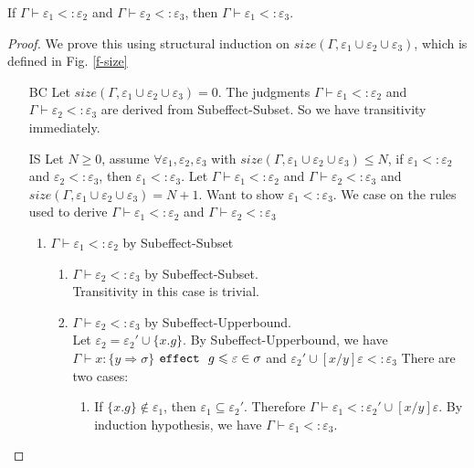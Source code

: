 \begin{lemma}
If $\Gamma \vdash \varepsilon_1 <: \varepsilon_2$ and $\Gamma \vdash \varepsilon_2 <: \varepsilon_3$, then $\Gamma \vdash \varepsilon_1 <: \varepsilon_3$.
\label{lemma-trans-effect}
\end{lemma}
\begin{proof}
We prove this using structural induction on $size(\Gamma, \varepsilon_1 \cup \varepsilon_2 \cup \varepsilon_3)$, which is defined in Fig. \ref{f-size}

\begin{enumerate}
\item[BC] Let $size(\Gamma, \varepsilon_1 \cup \varepsilon_2 \cup \varepsilon_3) = 0$. The judgments $\Gamma \vdash \varepsilon_1 <: \varepsilon_2$ and $\Gamma \vdash \varepsilon_2 <: \varepsilon_3$ are derived from Subeffect-Subset. So we have transitivity immediately.
\item[IS] Let $N \geq 0$, assume $\forall \varepsilon_1, \varepsilon_2, \varepsilon_3$ with $size(\Gamma, \varepsilon_1 \cup \varepsilon_2 \cup \varepsilon_3) \leq N$, if $\varepsilon_1 <: \varepsilon_2$ and $\varepsilon_2 <: \varepsilon_3$, then $\varepsilon_1 <: \varepsilon_3$. Let $\Gamma \vdash \varepsilon_1 <: \varepsilon_2$ and $\Gamma \vdash \varepsilon_2 <: \varepsilon_3$ and $size(\Gamma, \varepsilon_1 \cup \varepsilon_2 \cup \varepsilon_3) = N+1$. Want to show $\varepsilon_1 <: \varepsilon_3$. We case on the rules used to derive $\Gamma \vdash \varepsilon_1 <: \varepsilon_2$ and $\Gamma \vdash \varepsilon_2 <: \varepsilon_3$
\begin{enumerate}
    \item $\Gamma \vdash \varepsilon_1 <: \varepsilon_2$ by Subeffect-Subset
    \begin{enumerate}
        \item $\Gamma \vdash \varepsilon_2 <: \varepsilon_3$ by Subeffect-Subset. \\
        Transitivity in this case is trivial.
        \item $\Gamma \vdash \varepsilon_2 <: \varepsilon_3$ by Subeffect-Upperbound. \\
        Let $\varepsilon_2 = \varepsilon_2' \cup \{x.g\}$. By Subeffect-Upperbound, we have $\Gamma \vdash x : \{y \Rightarrow \sigma\}$ $\mathtt{effect}~\ g \leqslant \varepsilon \in \sigma$ and $\varepsilon_2'\cup [x/y]\varepsilon <: \varepsilon_3$ There are two cases:
        \begin{enumerate}
            \item  If $\{x.g\} \not\in \varepsilon_1$, then $\varepsilon_1 \subseteq \varepsilon_2'$. Therefore $\Gamma \vdash \varepsilon_1 <: \varepsilon_2'\cup [x/y]\varepsilon$. By induction hypothesis, we have $\Gamma \vdash \varepsilon_1 <: \varepsilon_3$. 

\end{enumerate}
\end{enumerate}
\end{enumerate}
\end{enumerate}
\end{proof}

